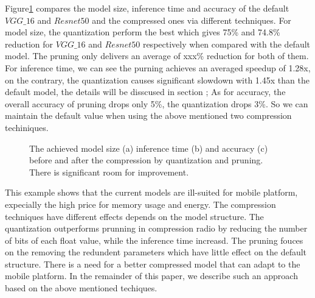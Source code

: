 Figure\ref{fig:motivation} compares the model size, inference time and accuracy of the default
$VGG\_16$ and $Resnet50$ and the compressed ones via different techniques.
For model size, the quantization perform the best which gives 75\% and 74.8\%
reduction for $VGG\_16$ and $Resnet50$ respectively when compared with the default model. 
The pruning only delivers an average of xxx\% reduction for both of them.
For inference time, we can see the purning achieves an averaged speedup of 1.28x,
on the contrary, the quantization causes significant slowdown with 1.45x than the default model,
the details will be disscused in section \FIXME{};
As for accuracy,  the overall accuracy of pruning drops only 5\%, the quantization drops 3\%.
So we can maintain the default value when using the above mentioned two compression techiniques.
\begin{figure}[!t]
\centering
{}
\hfill
{}
\hfill
{}
\caption{The achieved model size (a) inference time (b) and accuracy (c) before and after the compression by quantization and pruning.
There is significant room for improvement.} 
\label{fig:motivation}
\end{figure}

This example shows that the current models are ill-suited for mobile platform,
expecially the high price for memory usage and energy.
The compression techniques have different effects depends on the model 
structure.
The quantization outperforms prunning in compression radio by
reducing the number of bits of each float value, while the inference time increasd.
The pruning fouces on the removing the redundent parameters which have little effect 
on the default structure.
There is a need for a better compressed
model that can adapt to the mobile platform. In the remainder of this
paper, we describe such an approach based on the above mentioned techiques.




